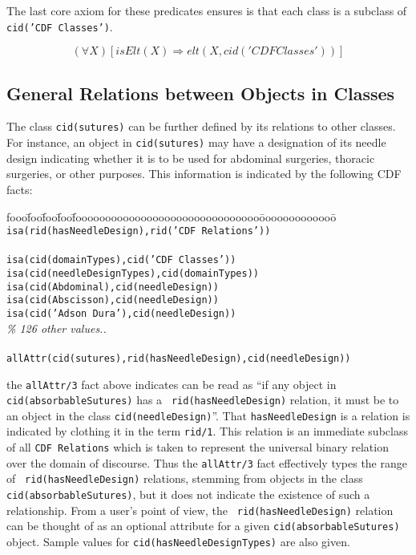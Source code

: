The last core axiom for these predicates ensures is that each class is
a subclass of {\tt cid('CDF Classes')}.

\begin{axiom} \label{ax:contained}
\[ (\forall X) [isElt(X) \Rightarrow elt(X,cid('CDF Classes'))] \]
\end{axiom} 

\subsection{General Relations between Objects in  Classes}

\begin{example} \rm \label{ex:suture2}
The class {\tt cid(sutures)} can be further defined by its relations
to other classes.  For instance, an object in {\tt cid(sutures)} may
have a designation of its needle design indicating whether it is to be
used for abdominal surgeries, thoracic surgeries, or other purposes.
This information is indicated by the following CDF facts:
%
{\small
\begin{tabbing}
fooo\=foo\=foo\=foo\=fooooooooooooooooooooooooooooooo\=ooooooooooooo\=\kill
\> {\tt isa(rid(hasNeedleDesign),rid('CDF Relations'))} \\
\\
\> {\tt isa(cid(domainTypes),cid('CDF Classes'))} \\
\> \> {\tt isa(cid(needleDesignTypes),cid(domainTypes))} \\
\> \> \> {\tt isa(cid(Abdominal),cid(needleDesign))} \\
\> \> \> {\tt isa(cid(Abscisson),cid(needleDesign))} \\
\> \> \> {\tt isa(cid('Adson Dura'),cid(needleDesign))} \\
\> {\it \% 126 other values..}  \\
\\
\> {\tt allAttr(cid(sutures),rid(hasNeedleDesign),cid(needleDesign))} 
\end{tabbing}
}
%
\noindent
the {\tt allAttr/3} fact above indicates can be read as ``if any
object in {\tt cid(absorbableSutures)} has a {\tt
rid(hasNeedleDesign)} relation, it must be to an object in the class
{\tt cid(needleDesign)}''.  That {\tt hasNeedleDesign} is a relation
is indicated by clothing it in the term {\tt rid/1}.  This relation is
an immediate subclass of all {\tt CDF Relations} which is taken to
represent the universal binary relation over the domain of discourse.
Thus the {\tt allAttr/3} fact effectively types the range of {\tt
rid(hasNeedleDesign)} relations, stemming from objects in the class
{\tt cid(absorbableSutures)}, but it does not indicate the existence
of such a relationship.  From a user's point of view, the {\tt
rid(hasNeedleDesign)} relation can be thought of as an optional
attribute for a given {\tt cid(absorbableSutures)} object.  Sample
values for {\tt cid(hasNeedleDesignTypes)} are also given.
\end{example} 

